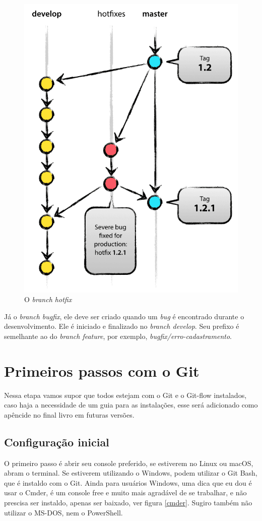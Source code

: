 \documentclass[12pt,openright,oneside,a4paper,english,brazil]{abntex2}
\begin{document}
\begin{figure}[h]
	\caption{\label{hotfix}O \textit{branch hotfix}}
	\begin{center}
		\includegraphics[width=0.6\linewidth]{hotfix}
	\end{center}
\end{figure}

Já o \textit{branch bugfix}, ele deve ser criado quando um \textit{bug} é encontrado durante o desenvolvimento. Ele é iniciado e finalizado no \textit{branch develop}. Seu prefixo é semelhante ao do \textit{branch feature}, por exemplo, \textit{bugfix/erro-cadastramento}.

\chapter{Primeiros passos com o Git}

Nessa etapa vamos supor que todos estejam com o Git e o Git-flow instalados, caso haja a necessidade de um guia para as instalações, esse será adicionado como apêncide no final livro em futuras versões.

\section{Configuração inicial \label{configinicial}}

O primeiro passo é abrir seu console preferido, se estiverem no Linux ou macOS, abram o terminal. Se estiverem utilizando o Windows, podem utilizar o Git Bash, que é instaldo com o Git. Ainda para usuários Windows, uma dica que eu dou é usar o Cmder, é um console free e muito mais agradável de se trabalhar, e não prescisa ser instaldo, apenas ser baixado, ver figura \ref{cmder}. Sugiro também não utilizar o MS-DOS, nem o PowerShell.
\end{document}
